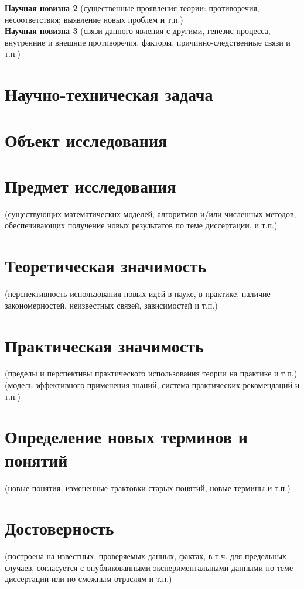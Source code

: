 \textbf{Научная новизна 2}
(существенные проявления теории: противоречия, несоответствия; выявление новых проблем и т.п.)\\

\textbf{Научная новизна 3}
(связи данного явления с другими, генезис процесса, внутренние и внешние противоречия, факторы, причинно-следственные связи и т.п.)

\section*{Научно-техническая задача}
\section*{Объект исследования}
\section*{Предмет исследования}
(существующих математических моделей, алгоритмов и/или численных методов, обеспечивающих получение новых результатов по теме диссертации, и т.п.)

\section*{Теоретическая значимость}
(перспективность использования новых идей в науке, в практике, наличие закономерностей, неизвестных связей, зависимостей и т.п.)

\section*{Практическая значимость}
(пределы и перспективы практического использования теории на практике и т.п.)\\

(модель эффективного применения знаний, система практических рекомендаций и т.п.)

\section*{Определение новых терминов и понятий}
(новые понятия, измененные трактовки старых понятий, новые термины и т.п.)

\section*{Достоверность}
(построена на известных, проверяемых данных, фактах, в т.ч. для предельных случаев, согласуется с опубликованными экспериментальными данными по теме диссертации или по смежным отраслям и т.п.)

